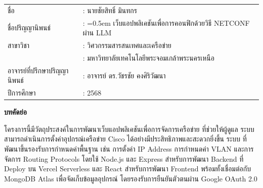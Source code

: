 {}

\vspace*{-0.5in}

 
\begin{tabularx}{\textwidth}{lX}
ชื่อ                           & : นายชัยสิทธิ์ มินทกร        %
\\
ชื่อปริญญานิพนธ์                  & : \hangindent=0.5em          %
                                เว็บแอปพลิเคชันเพื่อการคอนฟิกด้วยวิธี NETCONF ผ่าน LLM  %
\\
สาขาวิชา                       & : วิศวกรรมสารสนเทศและเครือข่าย %
\\
                             & : มหาวิทยาลัยเทคโนโลยีพระจอมเกล้าพระนครเหนือ
\\
อาจารย์ที่ปรึกษาปริญญานิพนธ์        & : อาจารย์ ดร.วัชรชัย คงศิริวัฒนา    %
\\
ปีการศึกษา                     & : 2568     %
\end{tabularx}

\vspace{5mm}
\begin{center}\textbf{บทคัดย่อ}\end{center}
\hspace*{1.3em} %
 โครงการนี้มีวัตถุประสงค์ในการพัฒนาเว็บแอปพลิเคชันเพื่อการจัดการเครือข่าย ที่ช่วยให้ผู้ดูแล
 ระบบสามารถดำเนินการตั้งค่าอุปกรณ์เครือข่าย Cisco ได้อย่างมีประสิทธิภาพและสะดวกยิ่งขึ้น ระบบ
 ที่พัฒนาขึ้นรองรับการกำหนดค่าพื้นฐาน เช่น การตั้งค่า IP Address การกำหนดค่า VLAN และการ
 จัดการ Routing Protocols โดยใช้ Node.js และ Express สำหรับการพัฒนา Backend ที่ Deploy บน 
 Vercel Serverless และ React สำหรับการพัฒนา Frontend พร้อมทั้งเชื่อมต่อกับ MongoDB Atlas 
 เพื่อจัดเก็บข้อมูลอุปกรณ์ โดยรองรับการยืนยันตัวตนผ่าน Google OAuth 2.0

